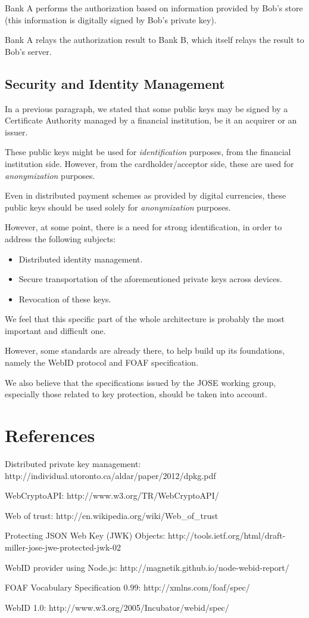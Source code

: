 Bank A performs the authorization based on information provided by Bob's
store (this information is digitally signed by Bob's private key).

Bank A relays the authorization result to Bank B, which itself relays
the result to Bob's server.

\subsection{Security and Identity
Management}\label{security-and-identity-management}

In a previous paragraph, we stated that some public keys may be signed
by a Certificate Authority managed by a financial institution, be it an
acquirer or an issuer.

These public keys might be used for \emph{identification} purposes, from
the financial institution side. However, from the cardholder/acceptor
side, these are used for \emph{anonymization} purposes.

Even in distributed payment schemes as provided by digital currencies,
these public keys should be used solely for \emph{anonymization}
purposes.

However, at some point, there is a need for strong identification, in
order to address the following subjects:

\begin{itemize}
\item
  Distributed identity management.
\item
  Secure transportation of the aforementioned private keys across
  devices.
\item
  Revocation of these keys.
\end{itemize}

We feel that this specific part of the whole architecture is probably
the most important and difficult one.

However, some standards are already there, to help build up its
foundations, namely the WebID protocol and FOAF specification.

We also believe that the specifications issued by the JOSE working
group, especially those related to key protection, should be taken into
account.

\section{References}\label{references}

Distributed private key management:
http://individual.utoronto.ca/aldar/paper/2012/dpkg.pdf

WebCryptoAPI: http://www.w3.org/TR/WebCryptoAPI/

Web of trust: http://en.wikipedia.org/wiki/Web\_of\_trust

Protecting JSON Web Key (JWK) Objects:
http://tools.ietf.org/html/draft-miller-jose-jwe-protected-jwk-02

WebID provider using Node.js:
http://magnetik.github.io/node-webid-report/

FOAF Vocabulary Specification 0.99: http://xmlns.com/foaf/spec/

WebID 1.0: http://www.w3.org/2005/Incubator/webid/spec/
